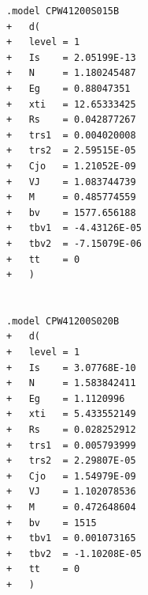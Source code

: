 \documentclass[12pt,a4paper]{article}
\begin{document}
\begin{verbatim}
.model CPW41200S015B
+	d(		
+	level = 1
+	Is    = 2.05199E-13
+	N     = 1.180245487
+	Eg    = 0.88047351
+	xti   = 12.65333425
+	Rs    = 0.042877267
+	trs1  = 0.004020008
+	trs2  = 2.59515E-05
+	Cjo   = 1.21052E-09
+	VJ    = 1.083744739
+	M     = 0.485774559
+	bv    = 1577.656188
+	tbv1  = -4.43126E-05
+	tbv2  = -7.15079E-06
+	tt    = 0
+	)		


.model CPW41200S020B
+	d(		
+	level = 1
+	Is    = 3.07768E-10
+	N     = 1.583842411
+	Eg    = 1.1120996
+	xti   = 5.433552149
+	Rs    = 0.028252912
+	trs1  = 0.005793999
+	trs2  = 2.29807E-05
+	Cjo   = 1.54979E-09
+	VJ    = 1.102078536
+	M     = 0.472648604
+	bv    = 1515
+	tbv1  = 0.001073165
+	tbv2  = -1.10208E-05
+	tt    = 0
+	)		
\end{verbatim}
~\cite{b20}
\end{document}
